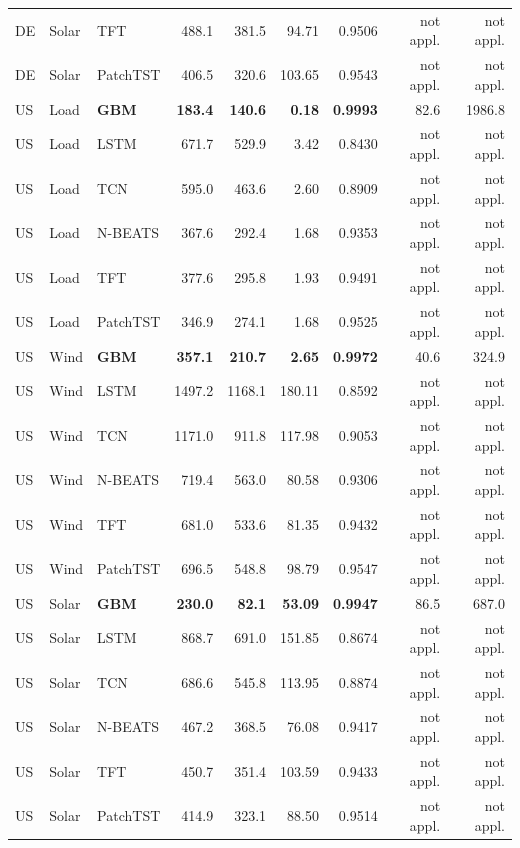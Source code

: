 \begin{table}[htbp]
{\begin{tabular}{lllrrrrrr}
DE & Solar & TFT & 488.1 & 381.5 & 94.71 & 0.9506 & not appl. & not appl. \\
DE & Solar & PatchTST & 406.5 & 320.6 & 103.65 & 0.9543 & not appl. & not appl. \\
\midrule
US & Load & \textbf{GBM} & \textbf{183.4} & \textbf{140.6} & \textbf{0.18} & \textbf{0.9993} & 82.6 & 1986.8 \\
US & Load & LSTM & 671.7 & 529.9 & 3.42 & 0.8430 & not appl. & not appl. \\
US & Load & TCN & 595.0 & 463.6 & 2.60 & 0.8909 & not appl. & not appl. \\
US & Load & N-BEATS & 367.6 & 292.4 & 1.68 & 0.9353 & not appl. & not appl. \\
US & Load & TFT & 377.6 & 295.8 & 1.93 & 0.9491 & not appl. & not appl. \\
US & Load & PatchTST & 346.9 & 274.1 & 1.68 & 0.9525 & not appl. & not appl. \\
\midrule
US & Wind & \textbf{GBM} & \textbf{357.1} & \textbf{210.7} & \textbf{2.65} & \textbf{0.9972} & 40.6 & 324.9 \\
US & Wind & LSTM & 1497.2 & 1168.1 & 180.11 & 0.8592 & not appl. & not appl. \\
US & Wind & TCN & 1171.0 & 911.8 & 117.98 & 0.9053 & not appl. & not appl. \\
US & Wind & N-BEATS & 719.4 & 563.0 & 80.58 & 0.9306 & not appl. & not appl. \\
US & Wind & TFT & 681.0 & 533.6 & 81.35 & 0.9432 & not appl. & not appl. \\
US & Wind & PatchTST & 696.5 & 548.8 & 98.79 & 0.9547 & not appl. & not appl. \\
\midrule
US & Solar & \textbf{GBM} & \textbf{230.0} & \textbf{82.1} & \textbf{53.09} & \textbf{0.9947} & 86.5 & 687.0 \\
US & Solar & LSTM & 868.7 & 691.0 & 151.85 & 0.8674 & not appl. & not appl. \\
US & Solar & TCN & 686.6 & 545.8 & 113.95 & 0.8874 & not appl. & not appl. \\
US & Solar & N-BEATS & 467.2 & 368.5 & 76.08 & 0.9417 & not appl. & not appl. \\
US & Solar & TFT & 450.7 & 351.4 & 103.59 & 0.9433 & not appl. & not appl. \\
US & Solar & PatchTST & 414.9 & 323.1 & 88.50 & 0.9514 & not appl. & not appl. \\
\bottomrule
\end{tabular}
}
\end{table}